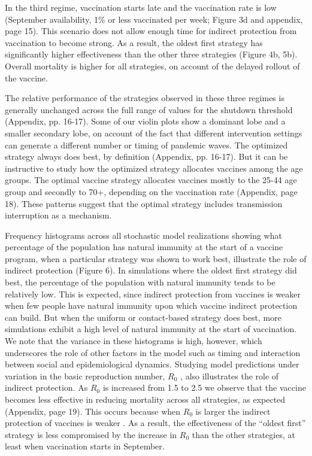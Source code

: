 In the third regime, vaccination starts late and the vaccination rate is low (September availability, 1\% or less vaccinated per week; Figure 3d and appendix, page 15). This scenario does not allow enough time for indirect protection from vaccination to become strong.  As a result, the oldest first strategy has significantly higher effectiveness than the other three strategies (Figure 4b, 5b).  Overall mortality is higher for all strategies, on account of the delayed rollout of the vaccine. 
  
The relative performance of the strategies observed in these three regimes is generally unchanged across the full range of values for the shutdown threshold (Appendix, pp. 16-17).  Some of our violin plots show a dominant lobe and a smaller secondary lobe, on account of the fact that different intervention settings can generate a different number or timing of pandemic waves.  The optimized strategy always does best, by definition (Appendix, pp. 16-17). But it can be instructive to study how the optimized strategy allocates vaccines among the age groups. The optimal vaccine strategy allocates vaccines mostly to the 25-44 age group and secondly to 70+, depending on the vaccination rate (Appendix, page 18). These patterns suggest that the optimal strategy includes transmission interruption as a mechanism.   

Frequency histograms across all stochastic model realizations showing what percentage of the population has natural immunity at the start of a vaccine program, when a particular strategy was shown to work best, illustrate the role of indirect protection (Figure 6). In simulations where the oldest first strategy did best, the percentage of the population with natural immunity tends to be relatively low. This is expected, since indirect protection from vaccines is weaker when few people have natural immunity upon which vaccine indirect protection can build.  But when the uniform or contact-based strategy does best, more simulations exhibit a high level of natural immunity at the start of vaccination.  We note that the variance in these histograms is high, however, which underscores the role of other factors in the model such as timing and interaction between social and epidemiological dynamics. Studying model predictions under variation in the basic reproduction number, $R_0$ \cite{anderson1992infectious}, also illustrates the role of indirect protection. As  $R_0$ is increased from 1.5 to 2.5 we observe that the vaccine becomes less effective in reducing mortality across all strategies, as expected (Appendix, page 19). This occurs because when $R_0$ is larger the indirect protection of vaccines is weaker \cite{anderson1992infectious}. As a result, the effectiveness of the “oldest first” strategy is less compromised by the increase in $R_0$ than the other strategies, at least when vaccination starts in September. 


